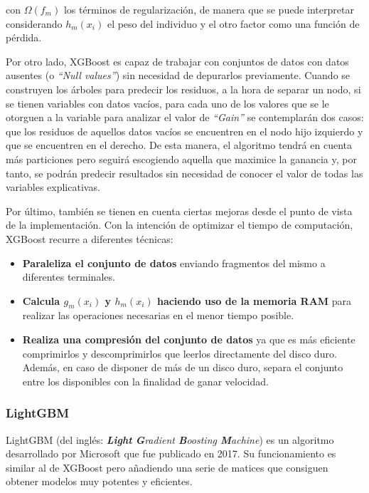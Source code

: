 \documentclass[12pt,twoside]{article}
\begin{document}
\noindent
con $\Omega(f_m)$ los términos de regularización, de manera que se puede interpretar considerando $h_m(x_i)$ el peso del individuo y el otro factor como una función de pérdida.

Por otro lado, XGBoost es capaz de trabajar con conjuntos de datos con datos ausentes (o \textit{``Null values''}) sin necesidad de depurarlos previamente. Cuando se construyen los árboles para predecir los residuos, a la hora de separar un nodo, si se tienen variables con datos vacíos, para cada uno de los valores que se le otorguen a la variable para analizar el valor de \textit{``Gain''} se contemplarán dos casos: que los residuos de aquellos datos vacíos se encuentren en el nodo hijo izquierdo y que se encuentren en el derecho. De esta manera, el algoritmo tendrá en cuenta más particiones pero seguirá escogiendo aquella que maximice la ganancia y, por tanto, se podrán predecir resultados sin necesidad de conocer el valor de todas las variables explicativas.

Por último, también se tienen en cuenta ciertas mejoras desde el punto de vista de la implementación. Con la intención de optimizar el tiempo de computación, XGBoost recurre a diferentes técnicas: 
\begin{itemize}
\item \textbf{Paraleliza el conjunto de datos} enviando fragmentos del mismo a diferentes terminales.

\item \textbf{Calcula $g_m(x_i)$ y $h_m(x_i)$ haciendo uso de la memoria RAM} para realizar las operaciones necesarias en el menor tiempo posible.

\item \textbf{Realiza una compresión del conjunto de datos} ya que es más eficiente comprimirlos y descomprimirlos que leerlos directamente del disco duro. Además, en caso de disponer de más de un disco duro, separa el conjunto entre los disponibles con la finalidad de ganar velocidad.
\end{itemize}



\subsubsection{LightGBM}

LightGBM (del inglés: \textit{\textbf{Light} \textbf{G}radient \textbf{B}oosting \textbf{M}achine}) \cite{CH02} es un algoritmo desarrollado por Microsoft que fue publicado en 2017. Su funcionamiento es similar al de XGBoost pero añadiendo una serie de matices que consiguen obtener modelos muy potentes y eficientes.
\end{document}
